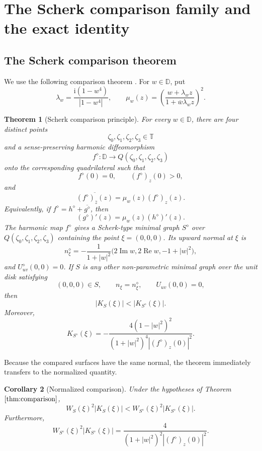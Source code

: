 \documentclass[11pt]{amsart}
\newtheorem{theorem}{Theorem}[section]
\newtheorem{corollary}[theorem]{Corollary}
\theoremstyle{remark}
\newcommand{\D}{\mathbb D}
\newcommand{\T}{\mathbb T}
\newcommand{\ii}{\mathrm i}
\numberwithin{equation}{section}
\begin{document}
\section{The Scherk comparison family and the exact identity}\label{sec:scherk}

\subsection{The Scherk comparison theorem}

We use the following comparison theorem \cite[Theorem 1.4]{KalajMelentijevic2026}.  For $w\in\D$, put
\[
        \lambda_w=\frac{\ii(1-w^4)}{|1-w^4|},
        \qquad
        \mu_w(z)=\left(\frac{w+\lambda_w z}{1+\overline w\lambda_w z}\right)^2.
\]

\begin{theorem}[Scherk comparison principle]\label{thm:comparison}
For every $w\in\D$, there are four distinct points
\[
        \zeta_0,\zeta_1,\zeta_2,\zeta_3\in\T
\]
and a sense-preserving harmonic diffeomorphism
\[
        f^\diamond:\D\to Q(\zeta_0,\zeta_1,\zeta_2,\zeta_3)
\]
onto the corresponding quadrilateral such that
\[
        f^\diamond(0)=0,
        \qquad
        (f^\diamond)_z(0)>0,
\]
and
\[
        \overline{(f^\diamond)_{\bar z}(z)}=\mu_w(z)(f^\diamond)_z(z).
\]
Equivalently, if $f^\diamond=h^\diamond+\overline{g^\diamond}$, then
\[
        (g^\diamond)'(z)=\mu_w(z)(h^\diamond)'(z).
\]
The harmonic map $f^\diamond$ gives a Scherk-type minimal graph $S^\diamond$ over $Q(\zeta_0,\zeta_1,\zeta_2,\zeta_3)$ containing the point $\xi=(0,0,0)$. Its upward normal at $\xi$ is
\[
        n^\diamond_\xi
        =-\frac{1}{1+|w|^2}\bigl(2\operatorname{Im}w,2\operatorname{Re}w,-1+|w|^2\bigr),
\]
and $U^\diamond_{uv}(0,0)=0$. If $S$ is any other non-parametric minimal graph over the unit disk satisfying
\[
        (0,0,0)\in S,
        \qquad
        n_\xi=n^\diamond_\xi,
        \qquad
        U_{uv}(0,0)=0,
\]
then
\[
        |K_S(\xi)|< |K_{S^\diamond}(\xi)|.
\]
Moreover,
\[
        K_{S^\diamond}(\xi)
        =-\frac{4(1-|w|^2)^2}{(1+|w|^2)^4 |(f^\diamond)_z(0)|^2}.
\]
\end{theorem}

Because the compared surfaces have the same normal, the theorem immediately transfers to the normalized quantity.

\begin{corollary}[Normalized comparison]\label{cor:normalized-comparison}
Under the hypotheses of Theorem~$\ref{thm:comparison}$,
\[
        W_S(\xi)^2 |K_S(\xi)|
        <
        W_{S^\diamond}(\xi)^2 |K_{S^\diamond}(\xi)|.
\]
Furthermore,
\[
        W_{S^\diamond}(\xi)^2 |K_{S^\diamond}(\xi)|
        =\frac{4}{(1+|w|^2)^2 |(f^\diamond)_z(0)|^2}.
\]
\end{corollary}
\end{document}
